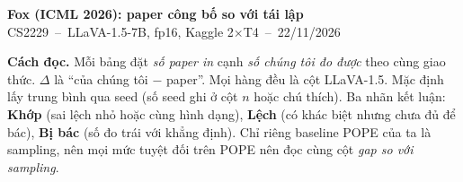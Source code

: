 \documentclass[10pt,a4paper]{article}
\newcommand{\ok}[1]{\textcolor{okc}{\textbf{#1}}}
\newcommand{\bad}[1]{\textcolor{badc}{\textbf{#1}}}
\newcommand{\warn}[1]{\textcolor{warnc}{\textbf{#1}}}
\begin{document}
\begin{center}
{\LARGE\bfseries Fox (ICML 2026): paper công bố so với tái lập}\\[4pt]
CS2229 \,--\, LLaVA-1.5-7B, fp16, Kaggle 2$\times$T4 \,--\, 22/11/2026
\end{center}

\noindent\textbf{Cách đọc.} Mỗi bảng đặt \emph{số paper in} cạnh \emph{số chúng tôi đo được} theo cùng giao thức. $\Delta$ là ``của chúng tôi $-$ paper''. Mọi hàng đều là cột LLaVA-1.5. Mặc định lấy trung bình qua seed (số seed ghi ở cột $n$ hoặc chú thích). Ba nhãn kết luận: \ok{Khớp} (sai lệch nhỏ hoặc cùng hình dạng), \warn{Lệch} (có khác biệt nhưng chưa đủ để bác), \bad{Bị bác} (số đo trái với khẳng định). Chỉ riêng baseline POPE của ta là sampling, nên mọi mức tuyệt đối trên POPE nên đọc cùng cột \emph{gap so với sampling}.
\end{document}
